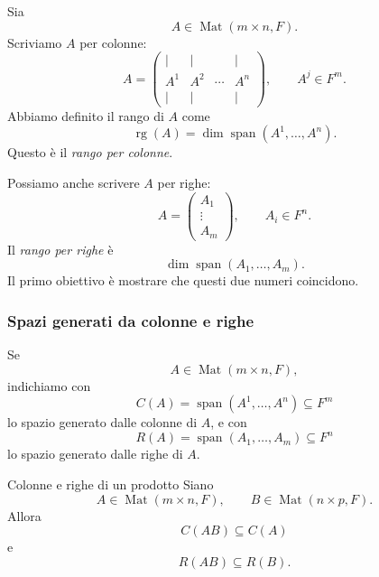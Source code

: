 \documentclass[a4paper]{article}
\begin{document}
Sia
\[
    A\in\operatorname{Mat}(m\times n,F).
\]
Scriviamo \(A\) per colonne:
\[
    A=
    \begin{pmatrix}
        \vert & \vert & & \vert\\
        A^1 & A^2 & \cdots & A^n\\
        \vert & \vert & & \vert
    \end{pmatrix},
    \qquad
    A^j\in F^m.
\]
Abbiamo definito il rango di \(A\) come
\[
    \operatorname{rg}(A)
    =
    \dim\operatorname{span}(A^1,\ldots,A^n).
\]
Questo è il \emph{rango per colonne}.

Possiamo anche scrivere \(A\) per righe:
\[
    A=
    \begin{pmatrix}
        A_1\\
        \vdots\\
        A_m
    \end{pmatrix},
    \qquad
    A_i\in F^n.
\]
Il \emph{rango per righe} è
\[
    \dim\operatorname{span}(A_1,\ldots,A_m).
\]
Il primo obiettivo è mostrare che questi due numeri coincidono.

\subsubsection{Spazi generati da colonne e righe}

Se
\[
    A\in\operatorname{Mat}(m\times n,F),
\]
indichiamo con
\[
    C(A)=\operatorname{span}(A^1,\ldots,A^n)\subseteq F^m
\]
lo spazio generato dalle colonne di \(A\), e con
\[
    R(A)=\operatorname{span}(A_1,\ldots,A_m)\subseteq F^n
\]
lo spazio generato dalle righe di \(A\).

\begin{snippetlemma}{Colonne e righe di un prodotto}
    Siano
    \[
        A\in\operatorname{Mat}(m\times n,F),
        \qquad
        B\in\operatorname{Mat}(n\times p,F).
    \]
    Allora
    \[
        C(AB)\subseteq C(A)
    \]
    e
    \[
        R(AB)\subseteq R(B).
    \]
\end{snippetlemma}
\end{document}
